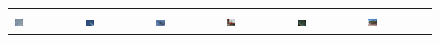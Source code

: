 \begin{figure}[t!]
\begin{tabular}{*{6}{C{0.13\textwidth}}}
  \includegraphics[height=0.12\textwidth,width=0.15\textwidth]{aeroplane_pos_000216.pdf}&
  \includegraphics[height=0.12\textwidth,width=0.15\textwidth]{aeroplane_pos_000521.pdf}&
  \includegraphics[height=0.12\textwidth,width=0.15\textwidth]{aeroplane_neg_002217.pdf}&
  \includegraphics[height=0.12\textwidth,width=0.15\textwidth]{bicycle_pos_000015.pdf}&
  \includegraphics[height=0.12\textwidth,width=0.15\textwidth]{bicycle_pos_000139.pdf}&
  \includegraphics[height=0.12\textwidth,width=0.15\textwidth]{bicycle_neg_002168.pdf}\\[-2ex]


\end{tabular}
\end{figure}
